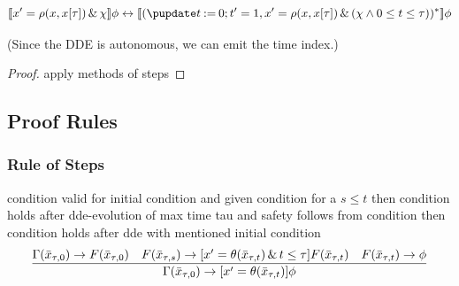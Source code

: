 \documentclass[10pt]{article}
\begin{document}
            \begin{equation}
                \dbox[]{\hevolvein{x'=\rho(x,\xtau)}{\chi}}{\phi}
                \lbisubjunct
                \dbox[]{(\hupdate{\humod{t}{0}};\hevolvein{t'=1\syssep x'=\rho(x,\xtau)}{(\chi\land 0\leq t\leq\tau)})^*}{\phi}
            \end{equation}

            (Since the DDE is autonomous, we can emit the time index.)

            \begin{proof}
                apply methods of steps
            \end{proof}

    \subsection{Proof Rules}
        \label{sec:proof-rules}

        \subsubsection{Rule of Steps}
            \label{sec:rule-of-steps}

            condition valid for initial condition and given condition for a $s\leq t$ then condition holds after dde-evolution of max time tau and safety follows from condition then condition holds after dde with mentioned initial condition
            \begin{equation}
            \frac{\Gamma(\bar{x}_{\tau,0})\rightarrow F(\bar{x}_{\tau,0})\quad F(\bar{x}_{\tau,s})\rightarrow [x'=\theta(\bar{x}_{\tau,t})\,\&\,t\leq\tau]F(\bar{x}_{\tau,t}) \quad F(\bar{x}_{\tau,t})\rightarrow\phi}{\Gamma(\bar{x}_{\tau,0}) \rightarrow [x'=\theta(\bar{x}_{\tau,t})]\phi}
            \end{equation}

            \begin{calculus}
            \end{calculus}
\end{document}

